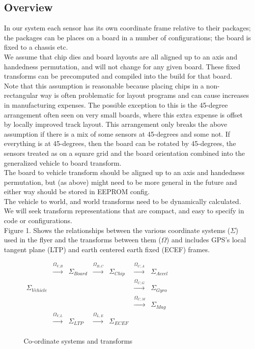 \documentclass{article}
\begin{document}
\subsection{Overview}
In our system each sensor has its own coordinate frame relative to their
packages; the packages can be places on a board in a number of
configurations; the board is fixed to a chassis etc.
\\
We assume that chip dies and board layouts are all aligned up to
an axis and handedness permutation, and will not change for any
given board. These fixed transforms can be precomputed and compiled
into the build for that board.
\\
Note that this assumption is reasonable because placing chips in a
non-rectangular way is often problematic for layout programs and can
cause increases in manufacturing expenses. The possible exception
to this is the 45-degree arrangement often seen on very small boards,
where this extra expense is offset by locally improved track layout.
This arrangement only breaks the above assumption if there is a mix of
some sensors at 45-degrees and some not. If everything is at
45-degrees, then the board can be rotated by 45-degrees, the sensors
treated as on a square grid and the board orientation combined into the
generalized vehicle to board transform.
\\
The board to vehicle transform should be aligned up to an axis and
handedness permutation, but (as above) might need to be more general in the
future and either way should be stored in EEPROM config.
\\
The vehicle to world, and world transforms need to be dynamically calculated.
\\
We will seek transform representations that are compact, and easy to specify in code
or configurations.
\\
Figure 1. Shows the relationships between the various coordinate
systems ($\Sigma$) used in the flyer and the transforms between them ($\Omega$) and includes
GPS's local tangent plane (LTP) and earth centered earth fixed (ECEF) frames.
\\
\begin{figure}[h]
\caption{Co-ordinate systems and transforms}
\centering
$\begin{matrix}
&\xrightarrow{\Omega_{V,B}} & \Sigma_{Board} & \xrightarrow{\Omega_{B,C}} &
  \Sigma_{Chip} & \xrightarrow{\Omega_{C,A}} & \Sigma_{Accel} \\
\Sigma_{Vehicle} &&&&&\xrightarrow{\Omega_{C,G}} & \Sigma_{Gyro}\\
&&&&&\xrightarrow{\Omega_{C,M}} & \Sigma_{Mag}\\
&\xrightarrow{\Omega_{V,L}} & \Sigma_{LTP} & \xrightarrow{\Omega_{L,E}} & \Sigma_{ECEF}\\
\end{matrix}$
\end{figure}
\end{document}
